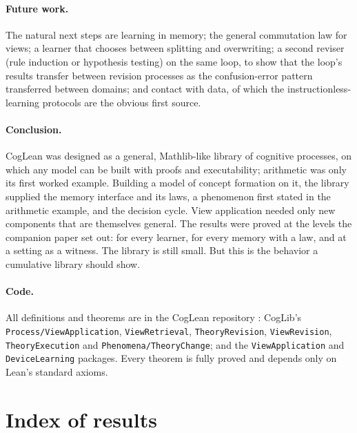 \documentclass[11pt]{article}
\newcommand{\code}[1]{\texttt{#1}}
\begin{document}
\paragraph{Future work.} The natural next steps are learning in memory; the general commutation law for views; a learner that chooses between splitting and overwriting; a second reviser (rule induction or hypothesis testing) on the same loop, to show that the loop's results transfer between revision processes as the confusion-error pattern transferred between domains; and contact with data, of which the instructionless-learning protocols \citep{shrager1986} are the obvious first source.

\paragraph{Conclusion.} CogLean was designed as a general, Mathlib-like library of cognitive processes, on which any model can be built with proofs and executability; arithmetic was only its first worked example. Building a model of concept formation on it, the library supplied the memory interface and its laws, a phenomenon first stated in the arithmetic example, and the decision cycle. View application needed only new components that are themselves general. The results were proved at the levels the companion paper set out: for every learner, for every memory with a law, and at a setting as a witness. The library is still small. But this is the behavior a cumulative library should show.

\paragraph{Code.} All definitions and theorems are in the CogLean repository \citep{coglean}: CogLib's \code{Process/ViewApplication}, \code{ViewRetrieval}, \code{TheoryRevision}, \code{ViewRevision}, \code{TheoryExecution} and \code{Phenomena/TheoryChange}; and the \code{ViewApplication} and \code{DeviceLearning} packages. Every theorem is fully proved and depends only on Lean's standard axioms.




\appendix
\section{Index of results}
\label{app:index}
\end{document}
